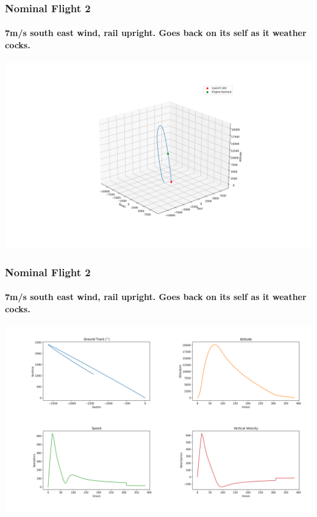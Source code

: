 \documentclass{beamer}
\begin{document}
    \begin{frame}
        \frametitle{Nominal Flight 2}
        \framesubtitle{7m/s south east wind, rail upright. Goes back on its self as it weather cocks.}
        \begin{center}
            \includegraphics[width=\textwidth]{images/example2.png}
        \end{center}
    \end{frame}
    \begin{frame}
        \frametitle{Nominal Flight 2}
        \framesubtitle{7m/s south east wind, rail upright. Goes back on its self as it weather cocks.}
        \begin{center}
            \includegraphics[width=\textwidth]{images/example2a.png}
        \end{center}
    \end{frame}
\end{document}
